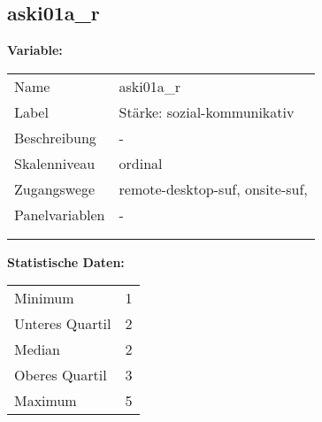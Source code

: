 	
	
	\subsection{aski01a\_r}
	\label{subSection:aski01a_r}

	\noindent\textbf{Variable:}\\
		\begin{tabular}{lL{11.3cm}}
			\label{tableVariable:aski01a_r}
			Name & aski01a\_r \\
			Label & Stärke: sozial-kommunikativ \\
			Beschreibung & - \\
			Skalenniveau & ordinal \\
			Zugangswege &
				remote-desktop-suf,
				onsite-suf,
 \\
			Panelvariablen & -
			 \\
			 \\
 \\
		\end{tabular}



		\vspace*{1 cm}
		\noindent\textbf{Statistische Daten:}\\
			\begin{tabular}{ll}
				\label{tableStatistics:aski01a_r}
					Minimum & 1 \\
					Unteres Quartil & 2 \\
					Median & 2 \\
					Oberes Quartil & 3 \\
					Maximum & 5 \\
			\end{tabular}



